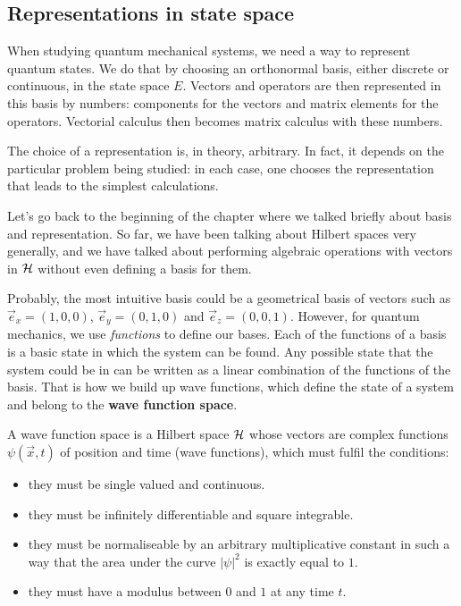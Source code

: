 \subsection{Representations in state space}

When studying quantum mechanical systems, we need a way to represent quantum states. We do that by choosing an orthonormal basis, either discrete or continuous, in the state space $E$. Vectors and operators are then represented in this basis by numbers: components for the vectors and matrix elements for the operators. Vectorial calculus then becomes matrix calculus with these numbers.

The choice of a representation is, in theory, arbitrary. In fact, it depends on the particular problem being studied: in each case, one chooses the representation that leads to the simplest calculations.

Let's go back to the beginning of the chapter where we talked briefly about basis and representation. So far, we have been talking about Hilbert spaces very generally, and we have talked about performing algebraic operations with vectors in $\mathcal{H}$ without even defining a basis for them. 


Probably, the most intuitive basis could be a geometrical basis of vectors such as $\vec{e}_x = (1, 0, 0)$, $\vec{e}_y = (0, 1, 0)$ and $\vec{e}_z = (0, 0, 1)$. However, for quantum mechanics, we use \textit{functions} to define our bases. Each of the functions of a basis is a basic state in which the system can be found. Any possible state that the system could be in can be written as a linear combination of the functions of the basis. That is how we build up wave functions, which define the state of a system and belong to the \textbf{wave function space}.

\begin{definition}\label{wavefunction_space}
    A wave function space is a Hilbert space $\mathcal{H}$ whose vectors are complex functions $\psi(\vec{x}, t)$ of position and time (wave functions), which must fulfil the conditions:
    
    \begin{itemize}
        \item they must be single valued and continuous.
        \item they must be infinitely differentiable and square integrable.
        \item they must be normaliseable by an arbitrary multiplicative constant in such a way that the area under the curve $|\psi|^2$ is exactly equal to $1$.
        \item they must have a modulus between $0$ and $1$ at any time $t$.
    \end{itemize}
\end{definition}

